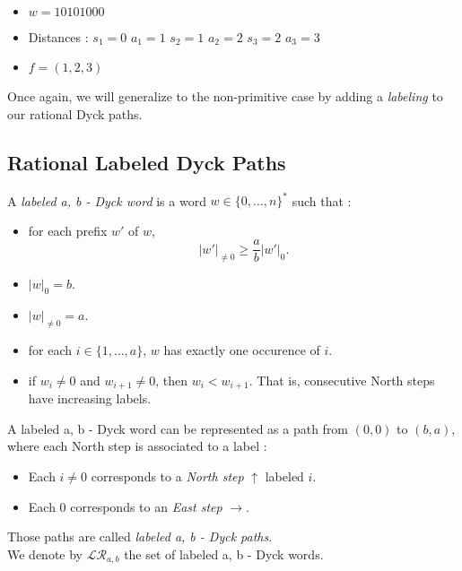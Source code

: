 \begin{example}[$a < b : a = 3, b = 5,
    \mathcal{R}_{a,b} \to \mathcal{PF'}_{a,b}$]
    ~\
    \begin{itemize}
        \item $w = 10101000$
    \end{itemize}
    
    \begin{itemize}
        \item Distances : 
            \subitem $s_1 = 0$
                \hspace{2cm} $a_1 = 1$
            \subitem $s_2 = 1$
                \hspace{2cm} $a_2 = 2$
            \subitem $s_3 = 2$
                \hspace{2cm} $a_3 = 3$
        \item $f = (1, 2, 3)$
    \end{itemize}
    
\end{example}

Once again, we will generalize to the non-primitive case by
adding a \emph{labeling} to our rational Dyck paths.

\subsection{Rational Labeled Dyck Paths}

\begin{definition}
    A \emph{labeled a, b - Dyck word} is a word $w \in 
    \{0, \ldots, n\}^*$ such that :
    \begin{itemize}
        \item for each prefix $w'$ of $w$,
            $$|w'|_{\neq 0} \geqslant \frac{a}{b}|w'|_0.$$
        \item $|w|_0 = b$.
        \item $|w|_{\neq 0} = a$.
        \item for each $i \in \{1, \ldots, a\}$, $w$ has 
            exactly one occurence of $i$.
        \item if $w_i \neq 0$ and $w_{i+1} \neq 0$,
            then $w_i < w_{i+1}$. That is, consecutive
            North steps have increasing labels.
    \end{itemize}
\end{definition}

A labeled a, b - Dyck word can be represented
as a path from $(0,0)$ to $(b,a)$, where each North
step is associated to a label :
\begin{itemize}
    \item Each $i \neq 0$ corresponds to a
        \emph{North step} $\uparrow$ labeled $i$.
    \item Each $0$ corresponds to an
        \emph{East step} $\rightarrow$.
\end{itemize}
Those paths are called \emph{labeled a, b - Dyck paths}.\\
We denote by $\mathcal{LR}_{a,b}$ the set of labeled
a, b - Dyck words.

